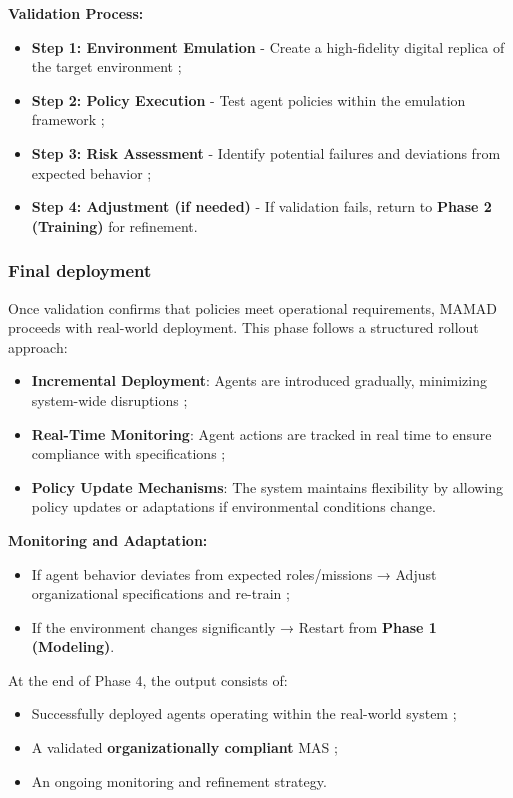 \documentclass[pdflatex,sn-mathphys-num]{sn-jnl}%
\theoremstyle{thmstyleone}%
\theoremstyle{thmstyletwo}%
\theoremstyle{thmstylethree}%
\begin{document}
\noindent \textbf{Validation Process:}
\begin{itemize}
    \item \textbf{Step 1: Environment Emulation} - Create a high-fidelity digital replica of the target environment ;
    \item \textbf{Step 2: Policy Execution} - Test agent policies within the emulation framework ;
    \item \textbf{Step 3: Risk Assessment} - Identify potential failures and deviations from expected behavior ;
    \item \textbf{Step 4: Adjustment (if needed)} - If validation fails, return to \textbf{Phase 2 (Training)} for refinement.
\end{itemize}

\subsubsection{Final deployment}
Once validation confirms that policies meet operational requirements, MAMAD proceeds with real-world deployment. This phase follows a structured rollout approach:

\begin{itemize}
    \item \textbf{Incremental Deployment}: Agents are introduced gradually, minimizing system-wide disruptions ;
    \item \textbf{Real-Time Monitoring}: Agent actions are tracked in real time to ensure compliance with specifications ;
    \item \textbf{Policy Update Mechanisms}: The system maintains flexibility by allowing policy updates or adaptations if environmental conditions change.
\end{itemize}

\noindent \textbf{Monitoring and Adaptation:}
\begin{itemize}
    \item If agent behavior deviates from expected roles/missions → Adjust organizational specifications and re-train ;
    \item If the environment changes significantly → Restart from \textbf{Phase 1 (Modeling)}.
\end{itemize}

At the end of Phase 4, the output consists of:
\begin{itemize}
    \item Successfully deployed agents operating within the real-world system ;
    \item A validated \textbf{organizationally compliant} MAS ;
    \item An ongoing monitoring and refinement strategy.
\end{itemize}
\end{document}
